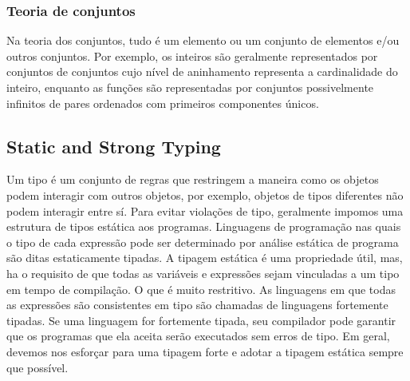 \subsubsection{Teoria de conjuntos}
Na teoria dos conjuntos, tudo é um elemento ou um conjunto de elementos e/ou outros conjuntos.
Por exemplo, os inteiros são geralmente representados por conjuntos de conjuntos cujo nível de aninhamento representa a cardinalidade do inteiro, enquanto as funções são representadas por conjuntos possivelmente infinitos de pares ordenados com primeiros componentes únicos.

\subsection{Static and Strong Typing}

Um tipo é um conjunto de regras que restringem a maneira como os objetos podem interagir com outros objetos, por exemplo, objetos de tipos diferentes não podem interagir entre sí.
Para evitar violações de tipo, geralmente impomos uma estrutura de tipos estática aos programas. 
Linguagens de programação nas quais o tipo de cada expressão pode ser determinado por análise estática de programa são ditas estaticamente tipadas.
A tipagem estática é uma propriedade útil, mas, ha o requisito de que todas as variáveis e expressões sejam vinculadas a um tipo em tempo de compilação.
O que é muito restritivo.
As linguagens em que todas as expressões são consistentes em tipo são chamadas de linguagens fortemente tipadas.
Se uma linguagem for fortemente tipada, seu compilador pode garantir que os programas que ela aceita serão executados sem erros de tipo.
Em geral, devemos nos esforçar para uma tipagem forte e adotar a tipagem estática sempre que possível.

